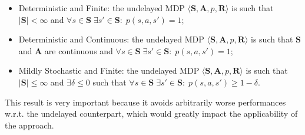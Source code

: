                 \begin{itemize}
                    \item Deterministic and Finite: the undelayed MDP $\langle \mathbf{S}, \mathbf{A}, p, \mathbf{R}\rangle$ is such that $|\mathbf{S}| < \infty$ and $\forall s \in \mathbf{S} \; \exists s' \in \mathbf{S}: \; p(s,a,s') = 1$;
                    \item Deterministic and Continuous: the undelayed MDP $\langle \mathbf{S}, \mathbf{A}, p, \mathbf{R}\rangle$ is such that $\mathbf{S}$ and $\mathbf{A}$ are continuous and $\forall s \in \mathbf{S} \; \exists s' \in \mathbf{S}: \; p(s,a,s') = 1$;
                    \item Mildly Stochastic and Finite: the undelayed MDP $\langle \mathbf{S}, \mathbf{A}, p, \mathbf{R}\rangle$ is such that $|\mathbf{S}| \leq \infty$ and $\exists \delta \leq 0$ such that $\forall s \in \mathbf{S} \; \exists s' \in \mathbf{S}: \; p(s,a,s') \geq 1 - \delta$.
                \end{itemize}
                
                This result is very important because it avoids arbitrarily worse performances w.r.t. the undelayed counterpart, which would greatly impact the applicability of the approach.
            
